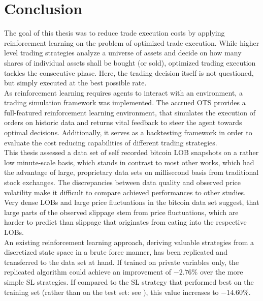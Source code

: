 \chapter{Conclusion}\label{chap:conclusion}
The goal of this thesis was to reduce trade execution costs by applying reinforcement learning on the problem of optimized trade execution. While higher level trading strategies analyze a universe of assets and decide on how many shares of individual assets shall be bought (or sold), optimized trading execution tackles the consecutive phase. Here, the trading decision itself is not questioned, but simply executed at the best possible rate.\\

As reinforcement learning requires agents to interact with an environment, a trading simulation framework was implemented. The accrued \ac{OTS} provides a full-featured reinforcement learning environment, that simulates the execution of orders on historic data and returns vital feedback to steer the agent towards optimal decisions. Additionally, it serves as a backtesting framework in order to evaluate the cost reducing capabilities of different trading strategies.\\

This thesis assessed a data set of self recorded bitcoin \ac{LOB} snapshots on a rather low minute-scale basis, which stands in contrast to most other works, which had the advantage of large, proprietary data sets on millisecond basis from traditional stock exchanges. The discrepancies between data quality and observed price volatility make it difficult to compare achieved performances to other studies. Very dense \ac{LOB}s and large price fluctuations in the bitcoin data set suggest, that large parts of the observed slippage stem from price fluctuations, which are harder to predict than slippage that originates from eating into the respective \ac{LOB}s.\\

An existing reinforcement learning approach, deriving valuable strategies from a discretized state space in a brute force manner, has been replicated and transferred to the data set at hand. If trained on private variables only, the replicated algorithm could achieve an improvement of $-2.76\%$ over the more simple \ac{SL} strategies. If compared to the \ac{SL} strategy that performed best on the training set (rather than on the test set: see ), this value increases to $-14.60\%$.\\

